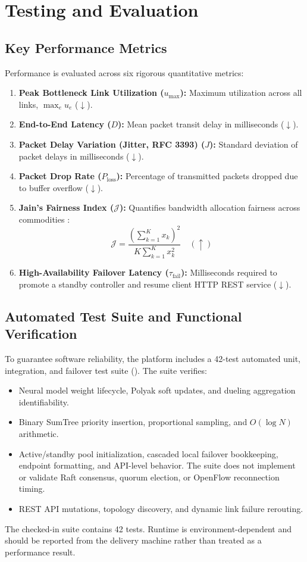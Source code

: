 \documentclass[12pt,a4paper,oneside]{report}
\newcommand{\code}[1]{\relax\ifmmode\text{\small\ttfamily\nolinkurl{#1}}\else{\small\ttfamily\nolinkurl{#1}}\fi}
\newcommand{\lowerbetter}{\ensuremath{\downarrow}}
\newcommand{\higherbetter}{\ensuremath{\uparrow}}
\begin{document}
\section{Testing and Evaluation}
\label{sec:testing}

\subsection{Key Performance Metrics}
Performance is evaluated across six rigorous quantitative metrics:
\begin{enumerate}
    \item \textbf{Peak Bottleneck Link Utilization ($u_{\max}$):} Maximum utilization across all links, $\max_{e} u_e$ (\lowerbetter).
    \item \textbf{End-to-End Latency ($D$):} Mean packet transit delay in milliseconds (\lowerbetter).
    \item \textbf{Packet Delay Variation (Jitter, RFC 3393) ($J$):} Standard deviation of packet delays in milliseconds (\lowerbetter).
    \item \textbf{Packet Drop Rate ($P_{\text{loss}}$):} Percentage of transmitted packets dropped due to buffer overflow (\lowerbetter).
    \item \textbf{Jain's Fairness Index ($\mathcal{J}$):} Quantifies bandwidth allocation fairness across commodities \cite{jain1984quantitative}:
    \begin{equation}
    \mathcal{J} = \frac{\left( \sum_{k=1}^K x_k \right)^2}{K \sum_{k=1}^K x_k^2} \quad (\higherbetter)
    \end{equation}
    \item \textbf{High-Availability Failover Latency ($\tau_{\text{fail}}$):} Milliseconds required to promote a standby controller and resume client HTTP REST service (\lowerbetter).
\end{enumerate}

\subsection{Automated Test Suite and Functional Verification}
To guarantee software reliability, the platform includes a 42-test automated unit, integration, and failover test suite (\code{test_suite.py}). The suite verifies:
\begin{itemize}
    \item Neural model weight lifecycle, Polyak soft updates, and dueling aggregation identifiability.
    \item Binary SumTree priority insertion, proportional sampling, and $O(\log N)$ arithmetic.
    \item Active/standby pool initialization, cascaded local failover bookkeeping, endpoint formatting, and API-level behavior. The suite does not implement or validate Raft consensus, quorum election, or OpenFlow reconnection timing.
    \item REST API mutations, topology discovery, and dynamic link failure rerouting.
\end{itemize}
The checked-in suite contains 42 tests. Runtime is environment-dependent and should be reported from the delivery machine rather than treated as a performance result.
\end{document}
